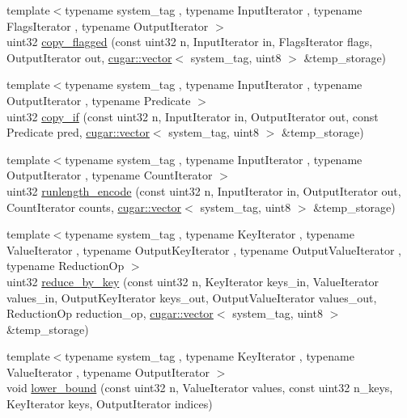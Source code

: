 \begin{DoxyCompactItemize}
\item 
{\footnotesize template$<$typename system\+\_\+tag , typename Input\+Iterator , typename Flags\+Iterator , typename Output\+Iterator $>$ }\\uint32 \hyperlink{group___primitives_gaafc4aac8b44cf750c98a3a97fe72e5c6}{copy\+\_\+flagged} (const uint32 n, Input\+Iterator in, Flags\+Iterator flags, Output\+Iterator out, \hyperlink{structcugar_1_1vector}{cugar\+::vector}$<$ system\+\_\+tag, uint8 $>$ \&temp\+\_\+storage)
\item 
{\footnotesize template$<$typename system\+\_\+tag , typename Input\+Iterator , typename Output\+Iterator , typename Predicate $>$ }\\uint32 \hyperlink{group___primitives_ga536856eaa09125bec01892d565a49f8e}{copy\+\_\+if} (const uint32 n, Input\+Iterator in, Output\+Iterator out, const Predicate pred, \hyperlink{structcugar_1_1vector}{cugar\+::vector}$<$ system\+\_\+tag, uint8 $>$ \&temp\+\_\+storage)
\item 
{\footnotesize template$<$typename system\+\_\+tag , typename Input\+Iterator , typename Output\+Iterator , typename Count\+Iterator $>$ }\\uint32 \hyperlink{group___primitives_gae48c0c95572ea1dd13ec562eed6e2755}{runlength\+\_\+encode} (const uint32 n, Input\+Iterator in, Output\+Iterator out, Count\+Iterator counts, \hyperlink{structcugar_1_1vector}{cugar\+::vector}$<$ system\+\_\+tag, uint8 $>$ \&temp\+\_\+storage)
\item 
{\footnotesize template$<$typename system\+\_\+tag , typename Key\+Iterator , typename Value\+Iterator , typename Output\+Key\+Iterator , typename Output\+Value\+Iterator , typename Reduction\+Op $>$ }\\uint32 \hyperlink{group___primitives_ga67aba73e3ceb623f48b734cb19889f1d}{reduce\+\_\+by\+\_\+key} (const uint32 n, Key\+Iterator keys\+\_\+in, Value\+Iterator values\+\_\+in, Output\+Key\+Iterator keys\+\_\+out, Output\+Value\+Iterator values\+\_\+out, Reduction\+Op reduction\+\_\+op, \hyperlink{structcugar_1_1vector}{cugar\+::vector}$<$ system\+\_\+tag, uint8 $>$ \&temp\+\_\+storage)
\item 
{\footnotesize template$<$typename system\+\_\+tag , typename Key\+Iterator , typename Value\+Iterator , typename Output\+Iterator $>$ }\\void \hyperlink{group___primitives_ga9dafac99df89cdd69ff33b9351e8cf7e}{lower\+\_\+bound} (const uint32 n, Value\+Iterator values, const uint32 n\+\_\+keys, Key\+Iterator keys, Output\+Iterator indices)

\end{DoxyCompactItemize}
